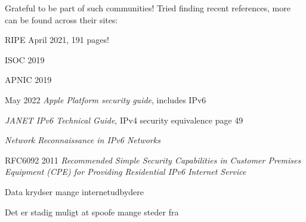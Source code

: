 \documentclass[Screen16to9,17pt]{foils}
\begin{document}

Grateful to be part of such communities! Tried finding recent references, more can be found across their sites:
\begin{list2}
\item RIPE April 2021, 191 pages!\\

\item ISOC 2019

\item APNIC 2019


\item May 2022 \emph{Apple Platform security guide}, includes IPv6\\

\item \emph{JANET IPv6 Technical Guide}, IPv4 security equivalence page 49\\

\item \emph{Network Reconnaissance in IPv6 Networks} 

\item RFC6092 2011 \emph{Recommended Simple Security Capabilities in Customer Premises Equipment (CPE) for Providing Residential IPv6 Internet Service}\\
\end{list2}




\begin{list2}
\item Data krydser mange internetudbydere
\item Det er stadig muligt at spoofe mange steder fra
\end{list2}
\end{document}
